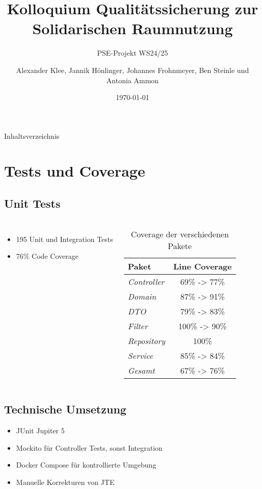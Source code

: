 \documentclass{sdqbeamer}
\title[Solidarische Raumnutzung Qualitätssicherung]{Kolloquium Qualitätssicherung zur Solidarischen Raumnutzung}
\subtitle{PSE-Projekt WS24/25}
\author[]{Alexander Klee, Jannik Hönlinger, Johannes Frohnmeyer, Ben Steinle und Antonia Ammon}
\date{\today}
\begin{document}
\KITtitleframe

\begin{frame}{Inhaltsverzeichnis}
\tableofcontents
\end{frame}

\section{Tests und Coverage}

\subsection{Unit Tests}
\begin{frame}{\insertsubsectionhead}
    \begin{columns}
         \begin{itemize}
            \item 195 Unit und Integration Tests
            \item 76\% Code Coverage
        \end{itemize}
         \begin{table}[h]
            \centering
            \renewcommand{\arraystretch}{1.3}
            \begin{tabular}{l|c}
                \textbf{Paket} & \textbf{Line Coverage} \\
                \hline
                \hline
                \textit{Controller}  & 69\% -> 77\% \\
                \textit{Domain}      & 87\% -> 91\%\\
                \textit{DTO}         & 79\% -> 83\%\\
                \textit{Filter}      & 100\% -> 90\% \\
                \textit{Repository}  & 100\% \\
                \textit{Service}     & 85\% -> 84\% \\
                \hline
                \textit{Gesamt}      & 67\% -> 76\% \\
            \end{tabular}
            \caption{Coverage der verschiedenen Pakete}
            \label{tab:progress}
        \end{table}
    \end{columns}
\end{frame}

\subsection{Technische Umsetzung}
\begin{frame}{\insertsubsectionhead}
    \begin{itemize}
        \item JUnit Jupiter 5
        \item Mockito für Controller Tests, sonst Integration
        \item Docker Compose für kontrollierte Umgebung
        \item Manuelle Korrekturen von JTE
    \end{itemize}
\end{frame}
\end{document}
